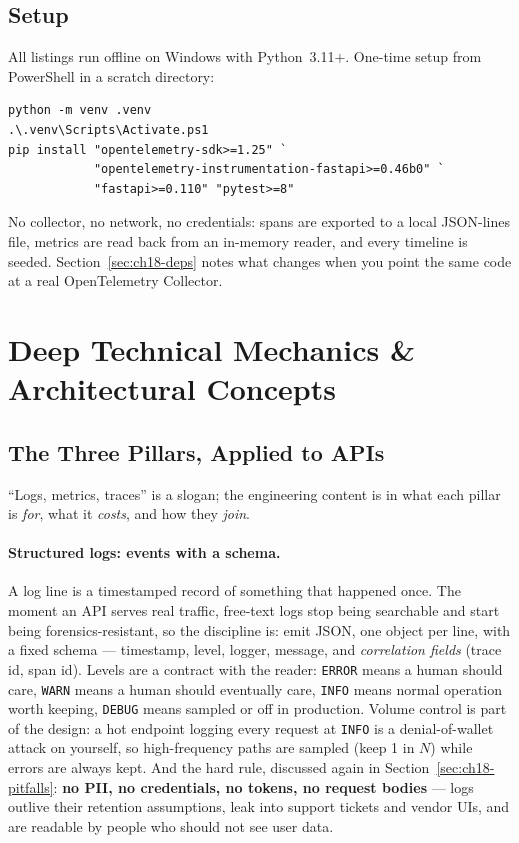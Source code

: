 \subsection*{Setup}
All listings run offline on Windows with Python~3.11+. One-time setup from
PowerShell in a scratch directory:

\begin{verbatim}
python -m venv .venv
.\.venv\Scripts\Activate.ps1
pip install "opentelemetry-sdk>=1.25" `
            "opentelemetry-instrumentation-fastapi>=0.46b0" `
            "fastapi>=0.110" "pytest>=8"
\end{verbatim}

No collector, no network, no credentials: spans are exported to a local
JSON-lines file, metrics are read back from an in-memory reader, and every
timeline is seeded. Section~\ref{sec:ch18-deps} notes what changes when you
point the same code at a real OpenTelemetry Collector.

\section{Deep Technical Mechanics \& Architectural Concepts}
\label{sec:ch18-mechanics}

\subsection{The Three Pillars, Applied to APIs}
\label{subsec:ch18-pillars}

``Logs, metrics, traces'' is a slogan; the engineering content is in what
each pillar is \emph{for}, what it \emph{costs}, and how they \emph{join}.

\paragraph{Structured logs: events with a schema.} A log line is a
timestamped record of something that happened once. The moment an API
serves real traffic, free-text logs stop being searchable and start being
forensics-resistant, so the discipline is: emit JSON, one object per line,
with a fixed schema --- timestamp, level, logger, message, and
\emph{correlation fields} (trace id, span id). Levels are a contract with
the reader: \texttt{ERROR} means a human should care, \texttt{WARN} means a
human should eventually care, \texttt{INFO} means normal operation worth
keeping, \texttt{DEBUG} means sampled or off in production. Volume control
is part of the design: a hot endpoint logging every request at
\texttt{INFO} is a denial-of-wallet attack on yourself, so high-frequency
paths are sampled (keep 1 in $N$) while errors are always kept. And the
hard rule, discussed again in Section~\ref{sec:ch18-pitfalls}: \textbf{no
PII, no credentials, no tokens, no request bodies} --- logs outlive their
retention assumptions, leak into support tickets and vendor UIs, and are
readable by people who should not see user data.

